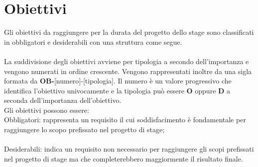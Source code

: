\section{Obiettivi}

Gli obiettivi da raggiungere per la durata del progetto dello stage sono classificati in obbligatori e desiderabili con una struttura come segue.
\\ \\
La suddivisione degli obiettivi avviene per tipologia a secondo dell'importanza e vengono numerati in ordine crescente. Vengono rappresentati inoltre da una sigla formata da \textbf{OB-}[numero]-[tipologia]. Il numero è un valore progressivo che identifica l'obiettivo univocamente e la tipologia può essere \textbf{O} oppure \textbf{D} a seconda dell'importanza dell'obiettivo. \\

Gli obiettivi possono essere: \\

Obbligatori: rappresenta un requisito il cui soddisfacimento è fondamentale
per raggiungere lo scopo prefissato nel progetto di stage;
\\\\
Desiderabili: indica un requisito non necessario per raggiungere gli scopi
prefissati nel progetto di stage ma che completerebbero maggiormente il risultato finale.
\\\\



